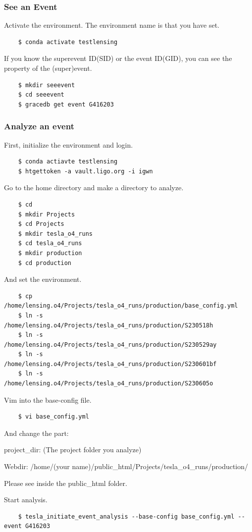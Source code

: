 \subsubsection{See an Event}

Activate the environment. The environment name is that you have set.

\begin{verbatim}
    $ conda activate testlensing
\end{verbatim}

If you know the superevent ID(SID) or the event ID(GID), you can see the property of the (super)event.

\begin{verbatim}
    $ mkdir seeevent
    $ cd seeevent
    $ gracedb get event G416203
\end{verbatim}

\subsubsection{Analyze an event}

First, initialize the environment and login.

\begin{verbatim}
    $ conda actiavte testlensing
    $ htgettoken -a vault.ligo.org -i igwn
\end{verbatim}

Go to the home directory and make a directory to analyze.

\begin{verbatim}
    $ cd
    $ mkdir Projects
    $ cd Projects
    $ mkdir tesla_o4_runs
    $ cd tesla_o4_runs
    $ mkdir production
    $ cd production
\end{verbatim}

And set the environment.

\begin{verbatim}
    $ cp /home/lensing.o4/Projects/tesla_o4_runs/production/base_config.yml
    $ ln -s /home/lensing.o4/Projects/tesla_o4_runs/production/S230518h
    $ ln -s /home/lensing.o4/Projects/tesla_o4_runs/production/S230529ay
    $ ln -s /home/lensing.o4/Projects/tesla_o4_runs/production/S230601bf
    $ ln -s /home/lensing.o4/Projects/tesla_o4_runs/production/S230605o
\end{verbatim}

Vim into the base-config file.

\begin{verbatim}
    $ vi base_config.yml
\end{verbatim}

And change the part:

project\_dir: (The project folder you analyze)

Webdir: /home/(your name)/public\_html/Projects/tesla\_o4\_runs/production/

Please see inside the public\_html folder.

Start analysis.

\begin{verbatim}
    $ tesla_initiate_event_analysis --base-config base_config.yml --event G416203
\end{verbatim}
